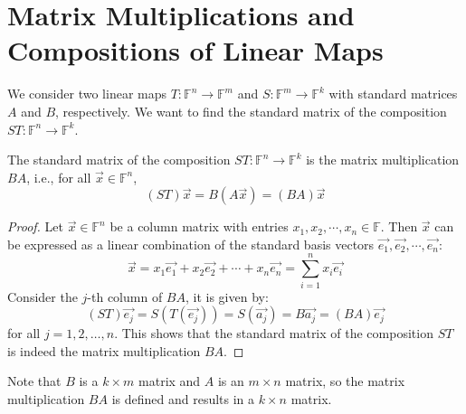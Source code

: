 \documentclass[
	11pt, %
	fleqn, %
	a4paper, %
]{LegrandOrangeBook}
\newcommand{\F}{\mathbb{F}} %
\begin{document}
\newpage

\section{Matrix Multiplications and Compositions of Linear Maps}

We consider two linear maps $T: \F^n \to \F^m$ and $S: \F^m \to \F^k$ with standard matrices $A$ and $B$, respectively. We want to find the standard matrix of the composition $ST: \F^n \to \F^k$.

\begin{center}
\end{center}

\begin{proposition}
    The standard matrix of the composition $ST: \F^n \to \F^k$ is the matrix multiplication $BA$, i.e., for all $\vec{x} \in \F^n$,
    \[
        (ST)\vec{x} = B(A\vec{x}) = (BA)\vec{x}
    \]
\end{proposition}

\begin{proof}
    Let $\vec{x} \in \F^n$ be a column matrix with entries $x_1, x_2, \cdots, x_n \in \F$. Then $\vec{x}$ can be expressed as a linear combination of the standard basis vectors $\vec{e_1}, \vec{e_2}, \cdots, \vec{e_n}$:
    \[
        \vec{x} = x_1 \vec{e_1} + x_2 \vec{e_2} + \cdots + x_n \vec{e_n} = \sum_{i=1}^{n} x_i \vec{e_i}
    \]
    Consider the $j$-th column of $BA$, it is given by:
    \[
        (ST)\vec{e_j} = S(T(\vec{e_j})) = S(\vec{a_j}) = B\vec{a_j} = (BA)\vec{e_j}
    \]
    for all $j = 1, 2, \ldots, n$. This shows that the standard matrix of the composition $ST$ is indeed the matrix multiplication $BA$.
\end{proof}

\begin{remark}
    Note that $B$ is a $k \times m$ matrix and $A$ is an $m \times n$ matrix, so the matrix multiplication $BA$ is defined and results in a $k \times n$ matrix.
\end{remark}
\end{document}
